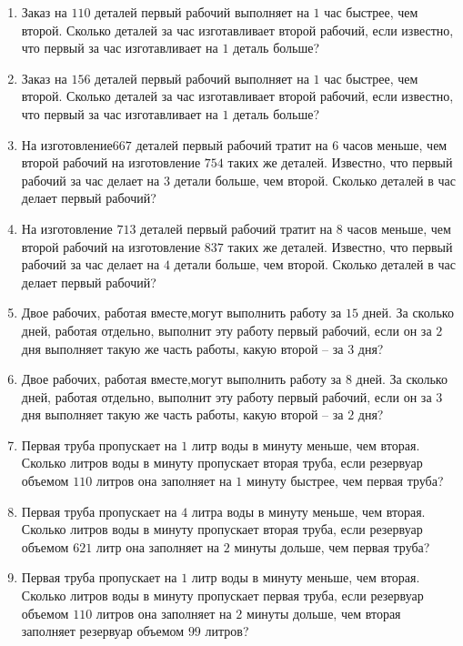 \documentclass[12pt, a4paper]{article}
\begin{document}
	
	\begin{enumerate}
		\item Заказ на \( 110 \) деталей первый рабочий выполняет на \( 1 \) час быстрее, чем второй. Сколько деталей за час изготавливает второй рабочий, если известно, что первый за час изготавливает на \( 1 \) деталь больше?
		\item Заказ на \( 156 \) деталей первый рабочий выполняет на \( 1 \) час быстрее, чем второй. Сколько деталей за час изготавливает второй рабочий, если известно, что первый за час изготавливает на \( 1 \) деталь больше?
		\item На изготовление\(667\) деталей первый рабочий тратит на \( 6 \) часов меньше, чем второй рабочий на изготовление \(754\) таких же деталей. Известно, что первый рабочий за час делает на \(3\) детали больше, чем второй. Сколько деталей в час делает первый рабочий?
		\item На изготовление \(713\) деталей первый рабочий тратит на \(8\) часов меньше, чем второй рабочий на изготовление \(837\) таких же деталей. Известно, что первый рабочий за час делает на \(4\) детали больше, чем второй. Сколько деталей в час делает первый рабочий?
		\item Двое рабочих, работая вместе,могут выполнить работу за \( 15 \) дней. За сколько дней, работая отдельно, выполнит эту работу первый  рабочий, если он за \(  2 \) дня выполняет такую же часть работы, какую второй – за \( 3 \) дня?
		\item Двое рабочих, работая вместе,могут выполнить работу за \( 8 \) дней. За сколько дней, работая отдельно, выполнит эту работу первый  рабочий, если он за \( 3 \) дня выполняет такую же часть работы, какую второй – за \( 2 \) дня?
		\item Первая труба пропускает на \( 1 \) литр воды в минуту меньше, чем вторая. Сколько литров воды в минуту пропускает вторая труба, если резервуар объемом \(110 \) литров она заполняет на \( 1 \) минуту быстрее, чем первая труба?
		\item Первая труба пропускает на \( 4 \) литра воды в минуту меньше, чем вторая. Сколько литров воды в минуту пропускает вторая труба, если резервуар объемом \(621 \) литр она заполняет на \( 2 \) минуты дольше, чем первая труба?
		\item Первая труба пропускает на \(1\) литр воды в минуту меньше, чем вторая. Сколько литров воды в минуту пропускает первая труба, если резервуар объемом \(110\) литров она заполняет на \( 2 \) минуты дольше, чем вторая заполняет резервуар объемом \(99\) литров?

\end{enumerate}
\end{document}
